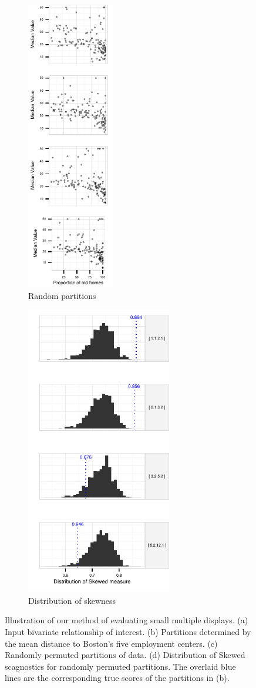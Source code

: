 \begin{figure}
\begin{subfigure}[t]{1.5in}
 	 \includegraphics[width=1.5in]{images/randCluster.pdf}
     \vspace{-0.37cm}
 	 \caption{Random partitions}
	 \label{fig:method_random}
    \end{subfigure}
     \begin{subfigure}[t]{2.5in}
 	\includegraphics[width=2.5in]{images/hist-DIS.pdf}
	\caption{Distribution of skewness}
	 \label{fig:method_dist}
     \end{subfigure}
   \caption{Illustration of our method of evaluating small multiple displays. (a) Input bivariate relationship of interest. (b) Partitions determined by the mean distance to Boston's five employment centers. (c) Randomly permuted partitions of data. (d) Distribution of Skewed scagnostics for randomly permuted partitions. The overlaid blue lines are the corresponding true scores of the partitions in (b).}
\end{figure}


